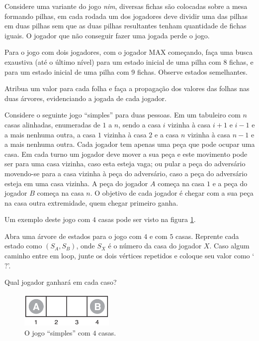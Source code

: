 \documentclass[12pt]{exam}
\begin{document}
\begin{questions}
\question Considere uma variante do jogo \textit{nim}, diversas fichas são colocadas sobre a mesa formando pilhas, em cada rodada um dos jogadores deve dividir uma das pilhas em duas pilhas sem que as duas pilhas resultantes tenham quantidade de fichas iguais. O jogador que não conseguir fazer uma jogada perde o jogo.

Para o jogo com dois jogadores, com o jogador MAX começando, faça uma busca exaustiva (até o último nível) para um estado inicial de uma pilha com 8 fichas, e para um estado inicial de uma pilha com 9 fichas. Observe estados semelhantes.

Atribua um valor para cada folha e faça a propagação dos valores das folhas nas duas árvores, evidenciando a jogada de cada jogador.



\question Considere o seguinte jogo ``simples'' para duas pessoas. Em um tabuleiro com $n$ casas alinhadas, enumeradas de $1$ a $n$, sendo a casa $i$ vizinha à casa $i+1$ e $i-1$ e a mais nenhuma outra, a casa $1$ vizinha à casa $2$ e a casa $n$ vizinha à casa $n-1$ e a mais nenhuma outra. 
Cada jogador tem apenas uma peça que pode ocupar uma casa. 
Em cada turno um jogador deve mover a sua peça e este movimento pode ser para uma casa vizinha, caso esta esteja vaga; ou pular a peça do adversário movendo-se para a casa vizinha à peça do adversário, caso a peça do adversário esteja em uma casa vizinha. A peça do jogador $A$ começa na casa $1$ e a peça do jogador $B$ começa na casa $n$. O objetivo de cada jogador é chegar com a sua peça na casa outra extremidade, quem chegar primeiro ganha.

Um exemplo deste jogo com $4$ casas pode ser visto na figura \ref{fig:simpleGame4}.

Abra uma árvore de estados para o jogo com $4$ e com $5$ casas. Reprente cada estado como $(S_A, S_B)$, onde $S_X$ é o número da casa do jogador $X$. Caso algum caminho entre em loop, junte os dois vértices repetidos e coloque seu valor como `$?$'.

Qual jogador ganhará em cada caso?

\begin{figure}[h]
    \centering
    \includegraphics[width=0.40\textwidth]{simpleGame4}
    \caption{O jogo ``simples'' com $4$ casas.}
    \label{fig:simpleGame4}
\end{figure}




\end{questions}
\end{document}
